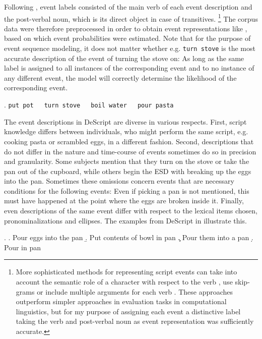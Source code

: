 Following \citet{manshadi.etal2008}, event labels consisted of the main verb of each event description and the post-verbal noun, which is its direct object in case of transitives.%
%
\footnote{More sophisticated methods for representing script events can take into account the semantic role of a character with respect to the verb \citep{chambers.jurafsky2008}, use skip-grams \citep{jans.etal2012} or include multiple arguments for each verb \citep{chambers.jurafsky2009, pichotta.mooney2014}. These approaches outperform simpler approaches in evaluation tasks in computational linguistics, but for my purpose of assigning each event a distinctive label taking the verb and post-verbal noun as event representation was sufficiently accurate.}\afterfn%
%
The corpus data were therefore preprocessed in order to obtain event representations like \Next, based on which event probabilities were estimated. Note that for the purpose of event sequence modeling, it does not matter whether e.g. \texttt{turn stove} is the most accurate description of the event of turning the stove on:  As long as the same label is assigned to all instances of the corresponding event and to no instance of any different event, the model will correctly determine the likelihood of the corresponding event. 

\ex. \texttt{put pot}~~~\texttt{turn stove}~~~\texttt{boil water}~~~\texttt{pour pasta}  

The event descriptions in DeScript are diverse in various respects. First, script knowledge differs between individuals, who might perform the same script, e.g. cooking pasta or scrambled eggs, in a different fashion. Second, descriptions that do not differ in the nature and time-course of events sometimes do so in precision and granularity. Some subjects mention that they turn on the stove or take the pan out of the cupboard, while others begin the ESD with breaking up the eggs into the pan. Sometimes these omissions concern events that are necessary conditions for the following events: Even if picking a pan is not mentioned, this must have happened at the point where the eggs are broken inside it. Finally, even descriptions of the same event differ with respect to the lexical items chosen, pronominalizations and ellipses. The examples from DeScript in \Next illustrate this.

\ex.    \label{ex:scripts-synonym}
\a. Pour eggs into the pan
\b. Put contents of bowl in pan
      \c. Pour them into a pan
      \d. Pour in pan

